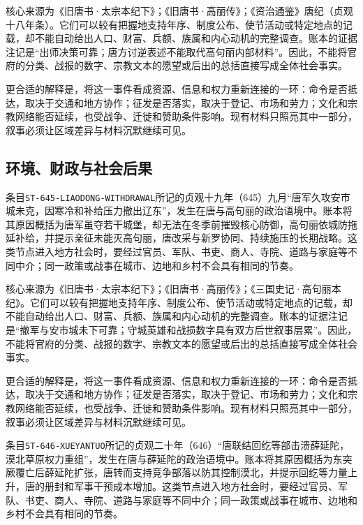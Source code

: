 核心来源为《旧唐书·太宗本纪下》；《旧唐书·高丽传》；《资治通鉴》唐纪（贞观十八年条）。它们可以较有把握地支持年序、制度公布、使节活动或特定地点的记载，却不能自动给出人口、财富、兵额、族属和内心动机的完整调查。账本的证据注记是“出师决策可靠；唐方讨逆表述不能取代高句丽内部材料”。因此，不能将官府的分类、战报的数字、宗教文本的愿望或后出的总括直接写成全体社会事实。

更合适的解释是，将这一事件看成资源、信息和权力重新连接的一环：命令是否抵达，取决于交通和地方协作；征发是否落实，取决于登记、市场和劳力；文化和宗教网络能否延续，也受战争、迁徙和赞助条件影响。现有材料只照亮其中一部分，叙事必须让区域差异与材料沉默继续可见。

\subsection{环境、财政与社会后果}


条目\texttt{ST-645-LIAODONG-WITHDRAWAL}所记的贞观十九年（645）九月“唐军久攻安市城未克，因寒冷和补给压力撤出辽东”，发生在唐与高句丽的政治语境中。账本将其原因概括为唐军虽夺若干城堡，却无法在冬季前摧毁核心防御，高句丽依城防拖延补给，并提示亲征未能灭高句丽，唐改采与新罗协同、持续施压的长期战略。这类节点进入地方社会时，要经过官员、军队、书吏、商人、寺院、道路与家庭等不同中介；同一政策或战事在城市、边地和乡村不会具有相同的节奏。

核心来源为《旧唐书·太宗本纪下》；《旧唐书·高丽传》；《三国史记·高句丽本纪》。它们可以较有把握地支持年序、制度公布、使节活动或特定地点的记载，却不能自动给出人口、财富、兵额、族属和内心动机的完整调查。账本的证据注记是“撤军与安市城未下可靠；守城英雄和战损数字具有双方后世叙事层累”。因此，不能将官府的分类、战报的数字、宗教文本的愿望或后出的总括直接写成全体社会事实。

更合适的解释是，将这一事件看成资源、信息和权力重新连接的一环：命令是否抵达，取决于交通和地方协作；征发是否落实，取决于登记、市场和劳力；文化和宗教网络能否延续，也受战争、迁徙和赞助条件影响。现有材料只照亮其中一部分，叙事必须让区域差异与材料沉默继续可见。


条目\texttt{ST-646-XUEYANTUO}所记的贞观二十年（646）“唐联结回纥等部击溃薛延陀，漠北草原权力重组”，发生在唐与薛延陀的政治语境中。账本将其原因概括为东突厥覆亡后薛延陀扩张，唐转而支持竞争部落以防其控制漠北，并提示回纥等力量上升，唐的册封和军事干预成本增加。这类节点进入地方社会时，要经过官员、军队、书吏、商人、寺院、道路与家庭等不同中介；同一政策或战事在城市、边地和乡村不会具有相同的节奏。

